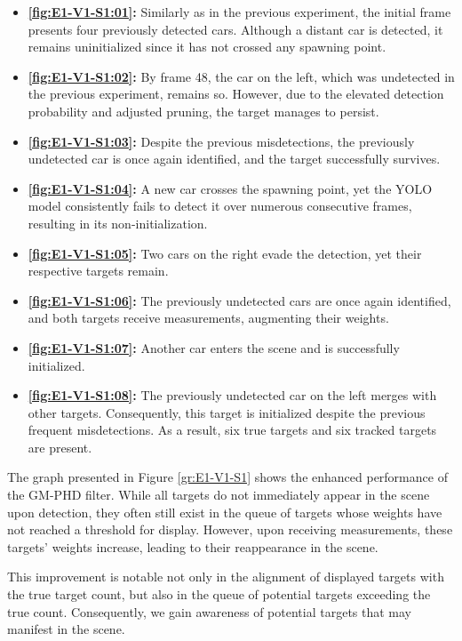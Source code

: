 \begin{itemize}
    \item \textbf{\ref{fig:E1-V1-S1:01}:} Similarly as in the previous experiment, the initial frame presents four
    previously detected cars. Although a distant car is detected, it remains uninitialized since it has not crossed any spawning point.
    \item \textbf{\ref{fig:E1-V1-S1:02}:} By frame 48, the car on the left, which was undetected in the previous
    experiment, remains so. However, due to the elevated detection probability and adjusted pruning, the target manages to persist.
    \item \textbf{\ref{fig:E1-V1-S1:03}:} Despite the previous misdetections, the previously undetected car is once
    again
    identified, and the target successfully survives.
    \item \textbf{\ref{fig:E1-V1-S1:04}:} A new car crosses the spawning point, yet the YOLO model consistently fails to detect it over numerous consecutive frames, resulting in its non-initialization.
    \item \textbf{\ref{fig:E1-V1-S1:05}:} Two cars on the right evade the detection, yet their respective targets
    remain.
    \item \textbf{\ref{fig:E1-V1-S1:06}:} The previously undetected cars are once again identified, and both targets
    receive measurements, augmenting their weights.
    \item \textbf{\ref{fig:E1-V1-S1:07}:} Another car enters the scene and is successfully initialized.
    \item \textbf{\ref{fig:E1-V1-S1:08}:} The previously undetected car on the left merges with other targets.
    Consequently, this target is initialized despite the previous frequent misdetections. As \linebreak a result, six true targets
    and six tracked targets are present.
\end{itemize}


The graph presented in Figure \ref{gr:E1-V1-S1} shows the enhanced performance of the GM-PHD filter. While all
targets do not immediately appear in the scene upon detection, they often still exist in the queue of targets
whose weights
have
not reached a threshold for display. However, upon receiving measurements, these targets' weights increase, leading to their reappearance in the scene.

This improvement is notable not only in the alignment of displayed targets with the true target count, but also in
the queue of potential targets exceeding the true count. Consequently, we gain awareness of potential targets that may manifest in the scene.


